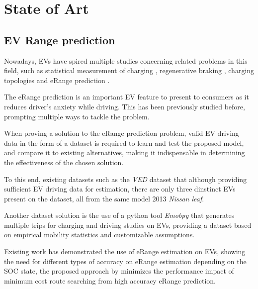 \chapter{State of Art}
\label{cha:stateOfArt}

\section{EV Range prediction} 
\label{sec:stateOfArtER}

Nowadays, \glspl{EV} have spired multiple studies
concerning related problems in this field,
such as statistical measurement of charging \citep{EVScout2},
regenerative braking \citep{regenerativeBraking},
charging topologies \citep{batteryChargerTopologies} 
and \gls{eRange} prediction \citep{predictionOfeRange}.

The \gls{eRange} prediction is an important 
\gls{EV} feature to present to consumers as
it reduces driver's anxiety while driving.
This has been previously studied before,
prompting multiple ways to tackle the problem.

When proving a solution to the \gls{eRange}
prediction problem, valid \gls{EV} driving data 
in the form of a \gls{dataset} is required to 
learn and test the proposed model,
and compare it to existing alternatives, 
making it indispensable in determining the
effectiveness of the chosen solution.

To this end, existing \glspl{dataset}
such as the \textit{VED} \gls{dataset} \citep{vedDataset}
that although providing sufficient \gls{EV} driving
data for estimation, there are only three dinstinct 
\glspl{EV} present on the \gls{dataset}, all from the 
same model 2013 \textit{Nissan leaf}.


Another \gls{dataset} solution is the use of 
a \gls{python} tool \textit{Emobpy} \citep{emobpy}
that generates multiple trips for charging and driving
studies on \glspl{EV}, providing a \gls{dataset}
based on empirical mobility statistics and 
customizable assumptions.


Existing work has demonstrated the use of
\gls{eRange} estimation on \glspl{EV}, 
showing the need for different types 
of accuracy on \gls{eRange}
estimation depending on the \gls{SOC} state,
the proposed approach by \cite{eRange}
minimizes the performance impact
of minimum cost route searching from high accuracy
\gls{eRange} prediction.

